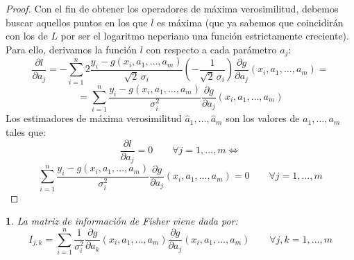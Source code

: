 \documentclass[11pt,a4paper,spanish]{article}
\numberwithin{equation}{section}
\numberwithin{table}{section}
\numberwithin{figure}{section}
\theoremstyle{definition}
\theoremstyle{remark}
\theoremstyle{definition}
\theoremstyle{remark}
\theoremstyle{plain}
\newtheorem{prop}{\protect\propositionname}[section]
\theoremstyle{plain}
\theoremstyle{plain}
\theoremstyle{plain}
\theoremstyle{plain}
\theoremstyle{plain}
\providecommand{\propositionname}{Proposición}
\begin{document}
\begin{proof}
		Con el fin de obtener los operadores de máxima verosimilitud, debemos
		buscar aquellos puntos en los que $l$ es máxima (que ya sabemos que
		coincidirán con los de $L$ por ser el logaritmo neperiano una función
		estrictamente creciente). Para ello, derivamos la función $l$ con
		respecto a cada parámetro $a_{j}$:
		\[
		\frac{\partial l}{\partial a_{j}}=-\sum_{i=1}^{n}2\frac{y_{i}-g\left(x_{i},a_{1},\dots,a_{m}\right)}{\sqrt{2}\,\sigma_{i}}\left(-\frac{1}{\sqrt{2}\,\sigma_{i}}\right)\frac{\partial g}{\partial a_{j}}\left(x_{i},a_{1},\dots,a_{m}\right)=
		\]
		\[
		=\sum_{i=1}^{n}\frac{y_{i}-g\left(x_{i},a_{1},\dots,a_{m}\right)}{\sigma_{i}^{2}}\frac{\partial g}{\partial a_{j}}\left(x_{i},a_{1},\dots,a_{m}\right)
		\]
		Los estimadores de máxima verosimilitud $\hat{a}_{1},\dots,\hat{a}_{m}$
		son los valores de $a_{1},\dots,a_{m}$ tales que:
		\[
		\frac{\partial l}{\partial a_{j}}=0\qquad\forall j=1,\dots,m\iff
		\]
		\[
		\sum_{i=1}^{n}\frac{y_{i}-g\left(x_{i},a_{1},\dots,a_{m}\right)}{\sigma_{i}^{2}}\frac{\partial g}{\partial a_{j}}\left(x_{i},a_{1},\dots,a_{m}\right)=0\qquad\forall j=1,\dots,m
		\]
	\end{proof}
	\begin{prop}
		\label{prop:semigeneral Fisher}La matriz de información de Fisher
		viene dada por:
		\[
		I_{j,k}=\sum_{i=1}^{n}\frac{1}{\sigma_{i}^{2}}\frac{\partial g}{\partial a_{k}}\left(x_{i},a_{1},\dots,a_{m}\right)\frac{\partial g}{\partial a_{j}}\left(x_{i},a_{1},\dots,a_{m}\right)\qquad\forall j,k=1,\dots,m
		\]
	\end{prop}
\end{document}
